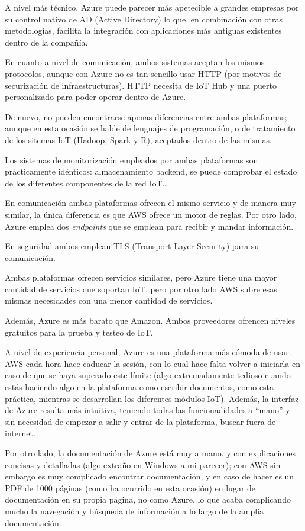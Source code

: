 \documentclass[english,runningheads,a4paper]{llncs}[2018/03/10]
\begin{document}
A nivel más técnico, Azure puede parecer más apetecible a grandes empresas por
su control nativo de AD (Active Directory) lo que, en combinación con otras
metodologías, facilita la integración con aplicaciones más antiguas existentes
dentro de la compañía.

En cuanto a nivel de comunicación, ambos sistemas aceptan los mismos protocolos,
aunque con Azure no es tan sencillo usar HTTP (por motivos de securización de
infraestructuras). HTTP necesita de IoT Hub y una puerto personalizado para
poder operar dentro de Azure.

De nuevo, no pueden encontrarse apenas diferencias entre ambas plataformas;
aunque en esta ocasión se hable de lenguajes de programación, o de tratamiento 
de los sitemas IoT (Hadoop, Spark y R), aceptados dentro de las mismas.

Los sistemas de monitorización empleados por ambas plataformas son prácticamente
idénticos: almacenamiento backend, se puede comprobar el estado de los
diferentes componentes de la red IoT\dots

En comunicación ambas plataformas ofrecen el mismo servicio y de manera muy
similar, la única diferencia es que AWS ofrece un motor de reglas. Por otro
lado, Azure emplea dos \textit{endpoints} que se emplean para recibir y mandar
información.

En seguridad ambos emplean TLS (Transport Layer Security) para su comunicación.

Ambas plataformas ofrecen servicios similares, pero Azure tiene una mayor
cantidad de servicios que soportan IoT, pero por otro lado AWS subre esas mismas
necesidades con una menor cantidad de servicios.

Además, Azure es más barato que Amazon. Ambos proveedores ofrencen niveles
gratuitos para la prueba y testeo de IoT.

A nivel de experiencia personal, Azure es una plataforma más cómoda de usar. AWS
cada hora hace caducar la sesión, con lo cual hace falta volver a iniciarla en
caso de que se haya superado este límite (algo extremadamente tedioso cuando
estás haciendo algo en la plataforma como escribir documentos, como esta
práctica, mientras se desarrollan los diferentes módulos IoT). Además, la
interfaz de Azure resulta más intuitiva, teniendo todas las funcionadidades a
``mano'' y sin necesidad de empezar a salir y entrar de la plataforma, buscar
fuera de internet.

Por otro lado, la documentación de Azure está muy a mano, y con explicaciones
concisas y detalladas (algo extraño en Windows a mi parecer); con AWS sin
embargo es muy complicado encontrar documentación, y en caso de hacer es un PDF
de 1000 páginas (como ha ocurrido en esta ocasión) en lugar de documentación en
su propia página, no como Azure, lo que acaba complicando mucho la navegación y
búsqueda de información a lo largo de la amplia documentación.
\end{document}
